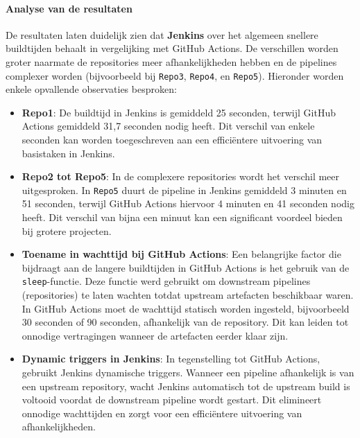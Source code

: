 \paragraph{Analyse van de resultaten}
De resultaten laten duidelijk zien dat \textbf{Jenkins} over het algemeen snellere buildtijden behaalt in vergelijking met GitHub Actions. De verschillen worden groter naarmate de repositories meer afhankelijkheden hebben en de pipelines complexer worden (bijvoorbeeld bij \texttt{Repo3}, \texttt{Repo4}, en \texttt{Repo5}). Hieronder worden enkele opvallende observaties besproken:

\begin{itemize}
    \item \textbf{Repo1}: De buildtijd in Jenkins is gemiddeld 25 seconden, terwijl GitHub Actions gemiddeld 31,7 seconden nodig heeft. Dit verschil van enkele seconden kan worden toegeschreven aan een efficiëntere uitvoering van basistaken in Jenkins.
    
    \item \textbf{Repo2 tot Repo5}: In de complexere repositories wordt het verschil meer uitgesproken. In \texttt{Repo5} duurt de pipeline in Jenkins gemiddeld 3 minuten en 51 seconden, terwijl GitHub Actions hiervoor 4 minuten en 41 seconden nodig heeft. Dit verschil van bijna een minuut kan een significant voordeel bieden bij grotere projecten.
    
    \item \textbf{Toename in wachttijd bij GitHub Actions}: Een belangrijke factor die bijdraagt aan de langere buildtijden in GitHub Actions is het gebruik van de \texttt{sleep}-functie. Deze functie werd gebruikt om downstream pipelines (repositories) te laten wachten totdat upstream artefacten beschikbaar waren. In GitHub Actions moet de wachttijd statisch worden ingesteld, bijvoorbeeld 30 seconden of 90 seconden, afhankelijk van de repository. Dit kan leiden tot onnodige vertragingen wanneer de artefacten eerder klaar zijn.
    
    \item \textbf{Dynamic triggers in Jenkins}: In tegenstelling tot GitHub Actions, gebruikt Jenkins dynamische triggers. Wanneer een pipeline afhankelijk is van een upstream repository, wacht Jenkins automatisch tot de upstream build is voltooid voordat de downstream pipeline wordt gestart. Dit elimineert onnodige wachttijden en zorgt voor een efficiëntere uitvoering van afhankelijkheden.
\end{itemize}

